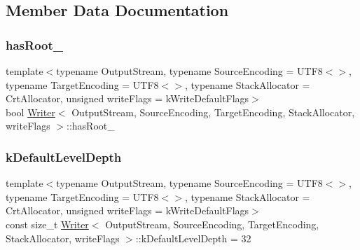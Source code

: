 \subsection{Member Data Documentation}
\mbox{\label{classWriter_affc6b9e0332b50bee0d33f8b1841c9a6}} 
\subsubsection{\texorpdfstring{has\+Root\+\_\+}{hasRoot\_}}
{\footnotesize\ttfamily template$<$typename Output\+Stream, typename Source\+Encoding = U\+T\+F8$<$$>$, typename Target\+Encoding = U\+T\+F8$<$$>$, typename Stack\+Allocator = Crt\+Allocator, unsigned write\+Flags = k\+Write\+Default\+Flags$>$ \\
bool \hyperlink{classWriter}{Writer}$<$ Output\+Stream, Source\+Encoding, Target\+Encoding, Stack\+Allocator, write\+Flags $>$\+::has\+Root\+\_\+\hspace{0.3cm}{\ttfamily [protected]}}

\mbox{\label{classWriter_a9cb4caeb9d8971f305edff1d70e67acb}} 
\subsubsection{\texorpdfstring{k\+Default\+Level\+Depth}{kDefaultLevelDepth}}
{\footnotesize\ttfamily template$<$typename Output\+Stream, typename Source\+Encoding = U\+T\+F8$<$$>$, typename Target\+Encoding = U\+T\+F8$<$$>$, typename Stack\+Allocator = Crt\+Allocator, unsigned write\+Flags = k\+Write\+Default\+Flags$>$ \\
const size\+\_\+t \hyperlink{classWriter}{Writer}$<$ Output\+Stream, Source\+Encoding, Target\+Encoding, Stack\+Allocator, write\+Flags $>$\+::k\+Default\+Level\+Depth = 32\hspace{0.3cm}{\ttfamily [static]}}

\mbox{\label{classWriter_ab46d66ae0ca78cb03ab7fb865d129934}} 

